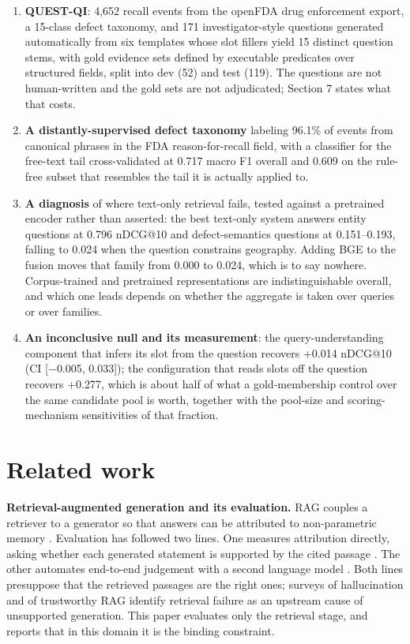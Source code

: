 \documentclass[runningheads]{llncs}
\begin{document}
\begin{enumerate}
\item \textbf{QUEST-QI}: 4,652 recall events from the openFDA drug enforcement export, a 15-class defect taxonomy, and 171 investigator-style questions generated automatically from six templates whose slot fillers yield 15 distinct question stems, with gold evidence sets defined by executable predicates over structured fields, split into dev (52) and test (119). The questions are not human-written and the gold sets are not adjudicated; Section 7 states what that costs.
\item \textbf{A distantly-supervised defect taxonomy} labeling 96.1\% of events from canonical phrases in the FDA reason-for-recall field, with a classifier for the free-text tail cross-validated at 0.717 macro F1 overall and 0.609 on the rule-free subset that resembles the tail it is actually applied to.
\item \textbf{A diagnosis} of where text-only retrieval fails, tested against a pretrained encoder rather than asserted: the best text-only system answers entity questions at 0.796 nDCG@10 and defect-semantics questions at 0.151--0.193, falling to 0.024 when the question constrains geography. Adding BGE to the fusion moves that family from 0.000 to 0.024, which is to say nowhere. Corpus-trained and pretrained representations are indistinguishable overall, and which one leads depends on whether the aggregate is taken over queries or over families.
\item \textbf{An inconclusive null and its measurement}: the query-understanding component that infers its slot from the question recovers +0.014 nDCG@10 (CI [$-$0.005, 0.033]); the configuration that reads slots off the question recovers +0.277, which is about half of what a gold-membership control over the same candidate pool is worth, together with the pool-size and scoring-mechanism sensitivities of that fraction.
\end{enumerate}


\section{Related work}
\textbf{Retrieval-augmented generation and its evaluation.} RAG couples a retriever to a generator so that answers can be attributed to non-parametric memory \cite{lewis2020rag,gao2023ragsurvey}. Evaluation has followed two lines. One measures attribution directly, asking whether each generated statement is supported by the cited passage \cite{rashkin2021attribution,bohnet2022aqa,gao2023alce,min2023factscore}. The other automates end-to-end judgement with a second language model \cite{es2023ragas,saadfalcon2023ares,zheng2023llmjudge}. Both lines presuppose that the retrieved passages are the right ones; surveys of hallucination \cite{ji2022hallucination} and of trustworthy RAG \cite{ni2025trustworthyrag} identify retrieval failure as an upstream cause of unsupported generation. This paper evaluates only the retrieval stage, and reports that in this domain it is the binding constraint.
\end{document}
